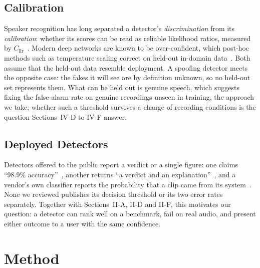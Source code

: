 \documentclass[journal]{IEEEtran}
\begin{document}
\subsection{Calibration}
Speaker recognition has long separated a detector's \emph{discrimination}
from its \emph{calibration}: whether its scores can be read as reliable
likelihood ratios, measured by $C_\text{llr}$~\cite{brummer2006}. Modern
deep networks are known to be over-confident, which post-hoc methods such as
temperature scaling correct on held-out in-domain data~\cite{guo2017}. Both
assume that the held-out data resemble deployment. A spoofing detector meets
the opposite case: the fakes it will see are by definition unknown, so no
held-out set represents them. What can be held out is genuine speech, which
suggests fixing the false-alarm rate on genuine recordings unseen in training,
the approach we take; whether such a threshold survives a change of recording
conditions is the question Sections~IV-D to IV-F answer.

\subsection{Deployed Detectors}
Detectors offered to the public report a verdict or a single figure: one
claims ``98.9\% accuracy''~\cite{aiornot}, another returns ``a verdict and an
explanation''~\cite{resembledetect}, and a vendor's own classifier reports
the probability that a clip came from its system~\cite{elevenclassifier}.
None we reviewed publishes its decision threshold or its two error rates
separately. Together with Sections~II-A, II-D and II-F, this motivates our
question: a detector can rank well on a benchmark, fail on real audio, and
present either outcome to a user with the same confidence.

\section{Method}
\end{document}
